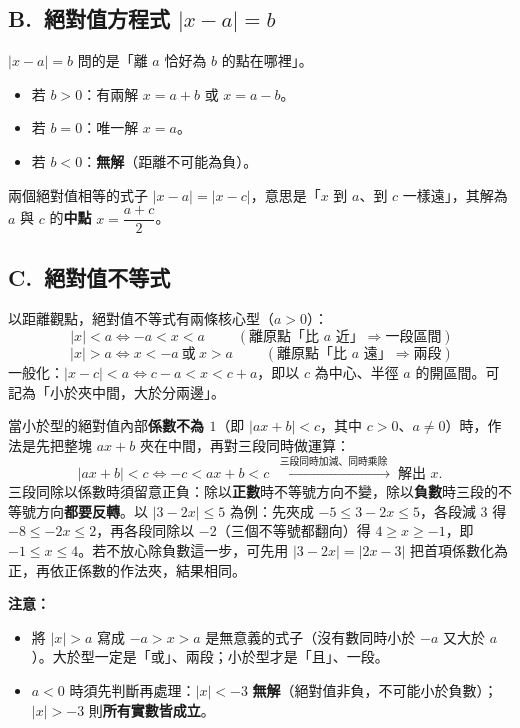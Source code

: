 \documentclass[11pt]{article}
\begin{document}
\subsection*{\sffamily B.\ 絕對值方程式 $|x-a|=b$}

$|x-a|=b$ 問的是「離 $a$ 恰好為 $b$ 的點在哪裡」。

\begin{itemize}\setlength{\itemsep}{1pt}
\item 若 $b>0$：有兩解 $x=a+b$ 或 $x=a-b$。
\item 若 $b=0$：唯一解 $x=a$。
\item 若 $b<0$：\textbf{無解}（距離不可能為負）。
\end{itemize}

兩個絕對值相等的式子 $|x-a|=|x-c|$，意思是「$x$ 到 $a$、到 $c$ 一樣遠」，其解為 $a$ 與 $c$ 的\textbf{中點} $x=\dfrac{a+c}{2}$。

\subsection*{\sffamily C.\ 絕對值不等式}

以距離觀點，絕對值不等式有兩條核心型（$a>0$）：
$$\boxed{\;|x|<a\iff -a<x<a\;}\qquad(\text{離原點「比 }a\text{ 近」}\Rightarrow\text{一段區間})$$
$$\boxed{\;|x|>a\iff x<-a\ \text{或}\ x>a\;}\qquad(\text{離原點「比 }a\text{ 遠」}\Rightarrow\text{兩段})$$
一般化：$|x-c|<a\iff c-a<x<c+a$，即以 $c$ 為中心、半徑 $a$ 的開區間。可記為「小於夾中間，大於分兩邊」。

當小於型的絕對值內部\textbf{係數不為 $1$}（即 $|ax+b|<c$，其中 $c>0$、$a\ne0$）時，作法是先把整塊 $ax+b$ 夾在中間，再對三段同時做運算：
$$|ax+b|<c\iff -c<ax+b<c\;\xrightarrow{\;\text{三段同時加減、同時乘除}\;}\;\text{解出 }x.$$
三段同除以係數時須留意正負：除以\textbf{正數}時不等號方向不變，除以\textbf{負數}時三段的不等號方向\textbf{都要反轉}。以 $|3-2x|\le5$ 為例：先夾成 $-5\le 3-2x\le5$，各段減 $3$ 得 $-8\le -2x\le2$，再各段同除以 $-2$（三個不等號都翻向）得 $4\ge x\ge-1$，即 $-1\le x\le4$。若不放心除負數這一步，可先用 $|3-2x|=|2x-3|$ 把首項係數化為正，再依正係數的作法夾，結果相同。

\textbf{注意：}
\begin{itemize}\setlength{\itemsep}{1pt}
\item 將 $|x|>a$ 寫成 $-a>x>a$ 是無意義的式子（沒有數同時小於 $-a$ 又大於 $a$）。大於型一定是「或」、兩段；小於型才是「且」、一段。
\item $a<0$ 時須先判斷再處理：$|x|<-3$ \textbf{無解}（絕對值非負，不可能小於負數）；$|x|>-3$ 則\textbf{所有實數皆成立}。
\end{itemize}
\end{document}
